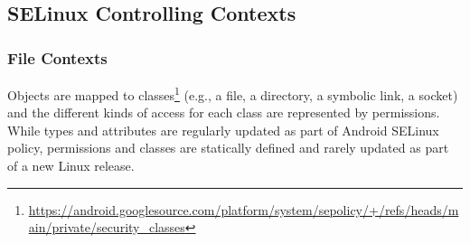 \subsection{SELinux Controlling Contexts}
\label{task:20231220_selinux}

\subsubsection{File Contexts}

Objects are mapped to classes\footnote{\url{https://android.googlesource.com/platform/system/sepolicy/+/refs/heads/main/private/security_classes}} (e.g., a file, a directory, a symbolic link, a socket) and the different kinds of access for each class are represented by permissions. While types and attributes are regularly updated as part of Android SELinux policy, permissions and classes are statically defined and rarely updated as part of a new Linux release.







